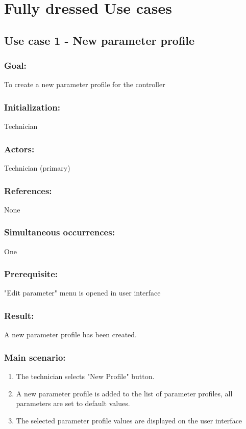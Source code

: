 \pagebreak

\section{Fully dressed Use cases }

\begin{framed}
\subsection{Use case 1 - New parameter profile}
\subsubsection*{Goal:}
To create a new parameter profile for the controller

\subsubsection*{Initialization:}
Technician

\subsubsection*{Actors:}
Technician (primary)

\subsubsection*{References:}
None

\subsubsection*{Simultaneous occurrences:}
One

\subsubsection*{Prerequisite:}
"Edit parameter" menu is opened in user interface

\subsubsection*{Result:}
A new parameter profile has been created.

\subsubsection*{Main scenario:}
\begin{enumerate}
	\item The technician selects "New Profile" button.
	\item A new parameter profile is added to the list of parameter profiles, all parameters are set to default values.
	\item The selected parameter profile values are displayed on the user interface
\end{enumerate}	
\end{framed}

